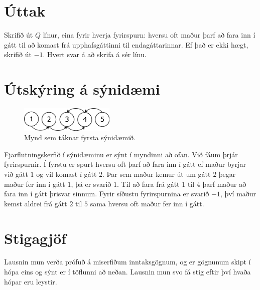 \section*{Úttak}
Skrifið út $Q$ línur, eina fyrir hverja fyrirspurn: hversu oft maður þarf að
fara inn í gátt til að komast frá upphafsgáttinni til endagáttarinnar. Ef það
er ekki hægt, skrifið út $-1$. Hvert svar á að skrifa á sér línu.

\section*{Útskýring á sýnidæmi}

\begin{figure}[ht!]
\centering
\includegraphics[width=0.4\textwidth]{portaler.png}
\caption{Mynd sem táknar fyrsta sýnidæmið.}
\label{overflow}
\end{figure}

Fjarflutningskerfið í sýnidæminu er sýnt í myndinni að ofan. Við fáum þrjár
fyrirspurnir. Í fyrstu er spurt hversu oft þarf að fara inn í gátt ef maður
byrjar við gátt $1$ og vil komast í gátt $2$. Þar sem maður kemur út um gátt
$2$ þegar maður fer inn í gátt $1$, þá er svarið $1$. Til að fara frá gátt $1$
til $4$ þarf maður að fara inn í gátt þrisvar sinnum. Fyrir síðustu
fyrirspurnina er svarið $-1$, því maður kemst aldrei frá gátt $2$ til $5$ sama
hversu oft maður fer inn í gátt.

\section*{Stigagjöf}
Lausnin mun verða prófuð á miserfiðum inntaksgögnum, og er gögnunum skipt í
hópa eins og sýnt er í töflunni að neðan. Lausnin mun svo fá stig eftir því
hvaða hópar eru leystir.

